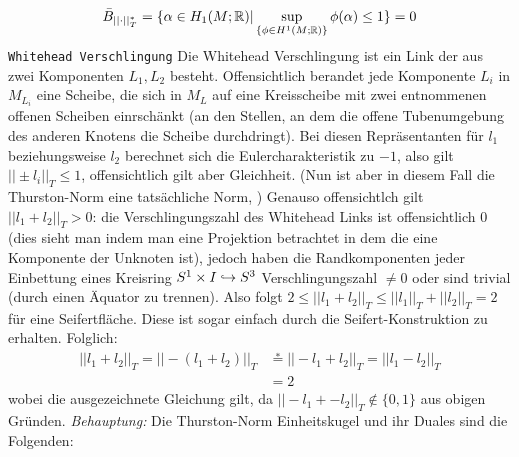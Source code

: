         \[
              \bar B_{||\cdot||_T^*}= \{\alpha \in H_1(M;\mathbb{R})| \sup_{\{\phi \in H^1(M;\mathbb{R})\}} \phi(\alpha)\leq 1\}=0
        \] 
        \texttt{Whitehead Verschlingung}
        Die Whitehead Verschlingung ist ein Link der aus zwei Komponenten $L_1,L_2$ besteht. Offensichtlich berandet jede Komponente $L_i$ in $M_{L_i}$ eine Scheibe, die sich in $M_L$ auf eine Kreisscheibe mit zwei entnommenen offenen Scheiben einrschänkt (an den Stellen, an dem die offene Tubenumgebung des anderen Knotens die Scheibe durchdringt). Bei diesen Repräsentanten für $l_1$ beziehungsweise $l_2$ berechnet sich die Eulercharakteristik zu $-1$, also gilt $||\pm l_i||_T\leq 1$, offensichtlich gilt aber Gleichheit. (Nun ist aber in diesem Fall die Thurston-Norm eine tatsächliche Norm, ) Genauso offensichtlch gilt $||l_1+l_2||_T>0$: die Verschlingungszahl des Whitehead Links ist offensichtlich $0$ (dies sieht man indem man eine Projektion betrachtet in dem die eine Komponente der Unknoten ist), jedoch haben die Randkomponenten jeder Einbettung eines Kreisring $S^1\times I \hookrightarrow S^3$ Verschlingungszahl $\neq 0$ oder sind trivial (durch einen Äquator zu trennen). Also folgt $2 \leq ||l_1+l_2||_T \leq ||l_1||_T+||l_2||_T =2$ für eine Seifertfläche. Diese ist sogar einfach durch die Seifert-Konstruktion zu erhalten. Folglich:
        \begin{align*}
            ||l_1+l_2||_T =||-(l_1+l_2)||_T &\stackrel * = ||-l_1+l_2||_T = ||l_1-l_2||_T \\
            &=2
        \end{align*}
        wobei die ausgezeichnete Gleichung gilt, da $||-l_1+-l_2||_T\not \in \{0,1\}$ aus obigen Gründen.
        \emph{Behauptung:} Die Thurston-Norm Einheitskugel und ihr Duales sind die Folgenden:\\
